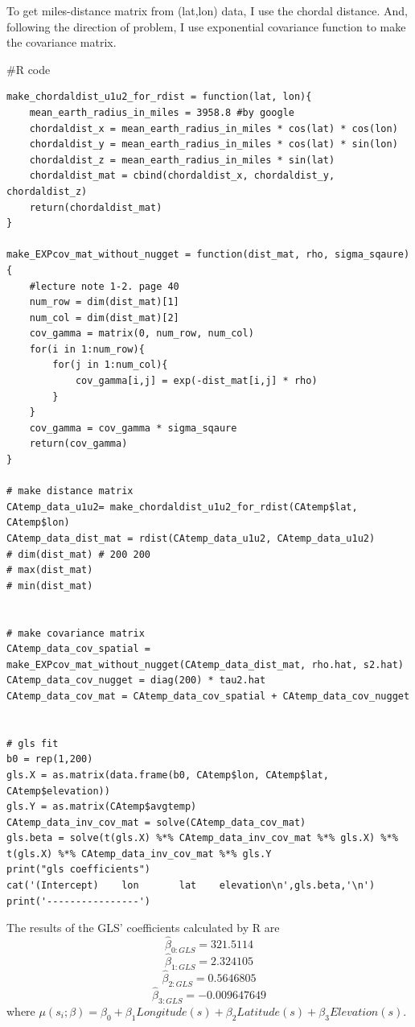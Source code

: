\documentclass{article}
\newenvironment{Rcode}%
{%
    \begin{mdframed}
    \#R code
    \begin{small}
}
{%
    \end{small}
    \end{mdframed}
}
\begin{document}
To get miles-distance matrix from (lat,lon) data, I use the chordal distance.
And, following the direction of problem, I use exponential covariance function to make the covariance matrix.
\begin{Rcode}
    \begin{verbatim}
make_chordaldist_u1u2_for_rdist = function(lat, lon){
    mean_earth_radius_in_miles = 3958.8 #by google
    chordaldist_x = mean_earth_radius_in_miles * cos(lat) * cos(lon)
    chordaldist_y = mean_earth_radius_in_miles * cos(lat) * sin(lon)
    chordaldist_z = mean_earth_radius_in_miles * sin(lat)
    chordaldist_mat = cbind(chordaldist_x, chordaldist_y, chordaldist_z)
    return(chordaldist_mat)
}
    
make_EXPcov_mat_without_nugget = function(dist_mat, rho, sigma_sqaure){
    #lecture note 1-2. page 40
    num_row = dim(dist_mat)[1] 
    num_col = dim(dist_mat)[2]
    cov_gamma = matrix(0, num_row, num_col)
    for(i in 1:num_row){
        for(j in 1:num_col){
            cov_gamma[i,j] = exp(-dist_mat[i,j] * rho)
        }
    }
    cov_gamma = cov_gamma * sigma_sqaure
    return(cov_gamma)
}
    
# make distance matrix
CAtemp_data_u1u2= make_chordaldist_u1u2_for_rdist(CAtemp$lat, CAtemp$lon)
CAtemp_data_dist_mat = rdist(CAtemp_data_u1u2, CAtemp_data_u1u2)
# dim(dist_mat) # 200 200
# max(dist_mat)
# min(dist_mat)


# make covariance matrix
CAtemp_data_cov_spatial = make_EXPcov_mat_without_nugget(CAtemp_data_dist_mat, rho.hat, s2.hat)
CAtemp_data_cov_nugget = diag(200) * tau2.hat
CAtemp_data_cov_mat = CAtemp_data_cov_spatial + CAtemp_data_cov_nugget


# gls fit
b0 = rep(1,200)
gls.X = as.matrix(data.frame(b0, CAtemp$lon, CAtemp$lat, CAtemp$elevation))
gls.Y = as.matrix(CAtemp$avgtemp)
CAtemp_data_inv_cov_mat = solve(CAtemp_data_cov_mat)
gls.beta = solve(t(gls.X) %*% CAtemp_data_inv_cov_mat %*% gls.X) %*% t(gls.X) %*% CAtemp_data_inv_cov_mat %*% gls.Y
print("gls coefficients")
cat('(Intercept)    lon       lat    elevation\n',gls.beta,'\n')
print('----------------')
    \end{verbatim}
\end{Rcode}

The results of the GLS' coefficients calculated by R are
\[\hat{\beta}_{0:GLS}=321.5114\]
\[\hat{\beta}_{1:GLS}=2.324105\]
\[\hat{\beta}_{2:GLS}=0.5646805\]
\[\hat{\beta}_{3:GLS}=-0.009647649\]
where \(\mu(s_i;\beta)=\beta_0+\beta_1 Longitude(s) + \beta_2 Latitude(s)+\beta_3 Elevation(s)\).
\end{document}
